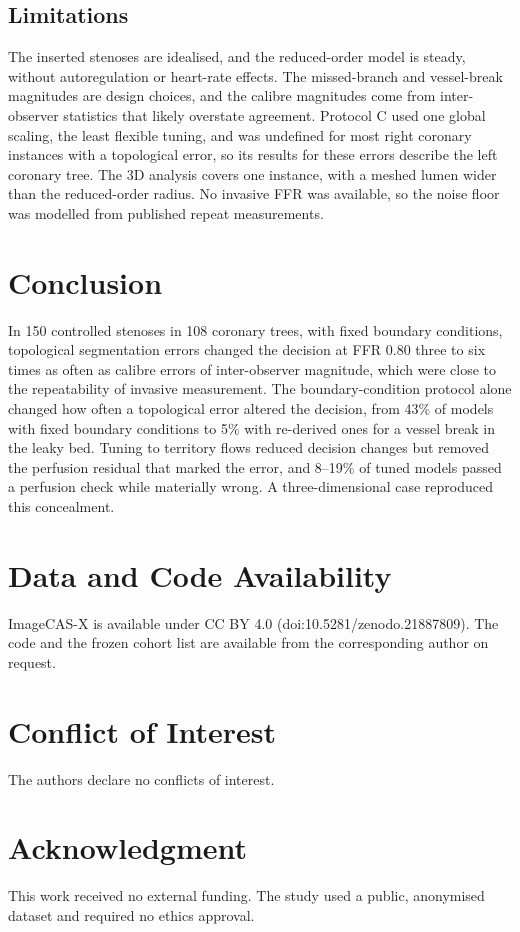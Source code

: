 \documentclass[journal]{IEEEtran}
\begin{document}
\subsection{Limitations}
The inserted stenoses are idealised, and the reduced-order model is steady, without autoregulation or heart-rate
effects. The missed-branch and vessel-break magnitudes are design choices, and the calibre magnitudes come from
inter-observer statistics that likely overstate agreement. Protocol C used one global scaling, the least flexible
tuning, and was undefined for most right coronary instances with a topological error, so its results for these
errors describe the left coronary tree. The 3D analysis covers one instance, with a meshed lumen wider than the
reduced-order radius. No invasive FFR was available, so the noise floor was modelled from published repeat
measurements.

\section{Conclusion}
In 150 controlled stenoses in 108 coronary trees, with fixed boundary conditions, topological segmentation errors
changed the decision at FFR 0.80 three to six times as often as calibre errors of inter-observer magnitude, which
were close to the repeatability of invasive measurement. The boundary-condition protocol alone changed how often a topological error altered the decision, from 43\% of
models with fixed boundary conditions to 5\% with re-derived ones for a vessel break in the leaky bed. Tuning to
territory flows reduced decision changes but removed the perfusion residual that marked the error, and 8--19\% of
tuned models passed a perfusion check while materially wrong. A three-dimensional case reproduced this concealment.

\section*{Data and Code Availability}
ImageCAS-X is available under CC BY 4.0 (doi:10.5281/zenodo.21887809). The code and the frozen cohort list are
available from the corresponding author on request.

\section*{Conflict of Interest}
The authors declare no conflicts of interest.

\section*{Acknowledgment}
This work received no external funding. The study used a public, anonymised dataset and required no ethics
approval.



\end{document}

